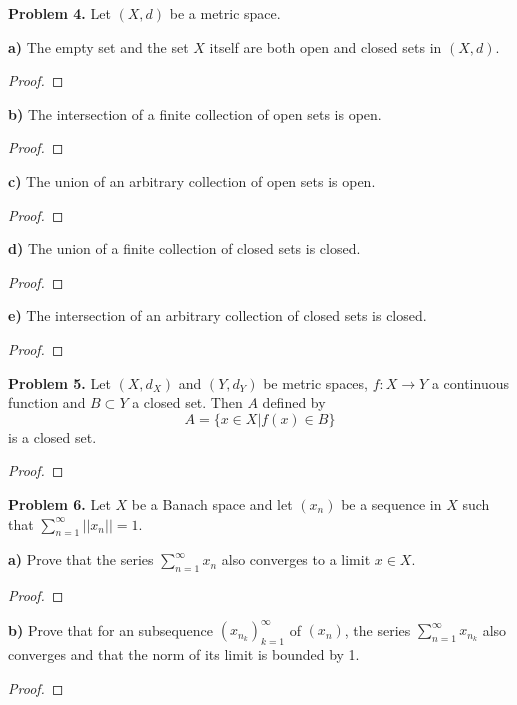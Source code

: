 \documentclass[12pt]{article}
\begin{document}
\newpage


\textbf{Problem 4.}
Let $(X, d)$ be a metric space.

\textbf{a)}
The empty set and the set $X$ itself are both open and closed sets in $(X,
d).$
\begin{proof}
\end{proof}

\textbf{b)}
The intersection of a finite collection of open sets is open.
\begin{proof}
\end{proof}

\textbf{c)}
The union of an arbitrary collection of open sets is open.
\begin{proof}
\end{proof}

\textbf{d)}
The union of a finite collection of closed sets is closed.
\begin{proof}
\end{proof}

\textbf{e)}
The intersection of an arbitrary collection of closed sets is closed.
\begin{proof}
\end{proof}


\textbf{Problem 5.}
Let $(X, d_X)$ and $(Y, d_Y)$ be metric spaces, $f: X \rightarrow Y$ a
continuous function and $B \subset Y$ a closed set. Then $A$ defined by
\[
    A = \{ x \in X | f(x) \in B \}
\]
is a closed set.
\begin{proof}
\end{proof}


\textbf{Problem 6.}
Let $X$ be a Banach space and let $(x_n)$ be a sequence in $X$ such that
$\sum_{n=1}^{\infty} ||x_n|| = 1$.

\textbf{a)}
Prove that the series $\sum_{n=1}^{\infty} x_n$ also converges to a limit $x \in X$.
\begin{proof}
\end{proof}

\textbf{b)}
Prove that for an subsequence $(x_{n_k})_{k=1}^{\infty}$ of $(x_n)$, the 
series $\sum_{n=1}^{\infty} x_{n_k}$ also converges and that the norm of
its limit is bounded by 1.
\begin{proof}
\end{proof}
\end{document}
